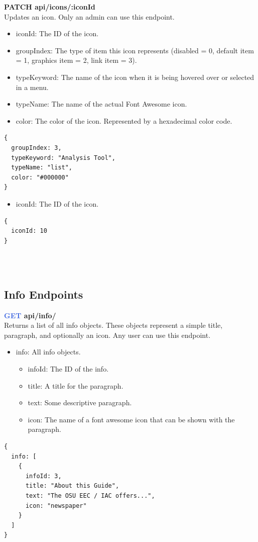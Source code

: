 \documentclass[onecolumn, draftclsnofoot,10pt, compsoc, usenames, dvipsnames]{IEEEtran}
\begin{document}
\noindent
\textbf{\textcolor{BlueGreen}{PATCH} api/icons/:iconId} \\
Updates an icon. Only an admin can use this endpoint.
\begin{itemize}
    \item iconId: The ID of the icon.
    \item groupIndex: The type of item this icon represents (disabled = 0, default item = 1, graphics item = 2, link item = 3).
    \item typeKeyword: The name of the icon when it is being hovered over or selected in a menu.
    \item typeName: The name of the actual Font Awesome icon.
    \item color: The color of the icon. Represented by a hexadecimal color code.
\end{itemize}
\begin{lstlisting}[caption=Example Request Body]
{
  groupIndex: 3,
  typeKeyword: "Analysis Tool",
  typeName: "list",
  color: "#000000"
}
\end{lstlisting}
\begin{itemize}
  \item iconId: The ID of the icon.
\end{itemize}
\begin{lstlisting}[caption=Example Response]
{ 
  iconId: 10
}
\end{lstlisting}
\\~\\


\subsection{Info Endpoints}


\noindent
\textbf{\textcolor{RoyalBlue}{GET} api/info/} \\
Returns a list of all info objects. These objects represent a simple title, paragraph, and optionally an icon. Any user can use this endpoint.
\begin{itemize}
    \item info: All info objects.
    \begin{itemize}
        \item infoId: The ID of the info.
        \item title: A title for the paragraph.
        \item text: Some descriptive paragraph.
        \item icon: The name of a font awesome icon that can be shown with the paragraph.
    \end{itemize}
\end{itemize}
\begin{lstlisting}[caption=Example Response]
{ 
  info: [
    {
      infoId: 3,
      title: "About this Guide",
      text: "The OSU EEC / IAC offers...",
      icon: "newspaper"
    }
  ]
}
\end{lstlisting}
\\~\\
\end{document}
